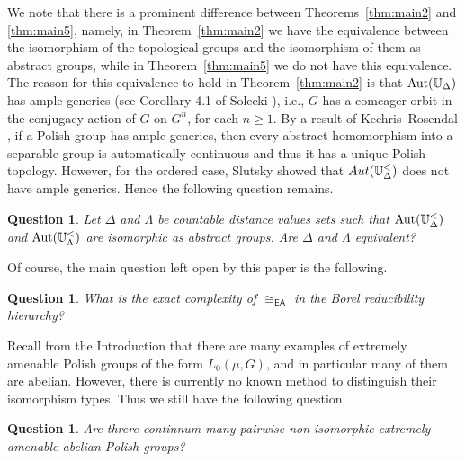 \documentclass{amsart}
\newtheorem{question}[theorem]{Question}
\theoremstyle{definition}
\theoremstyle{remark}
\begin{document}
We note that there is a prominent difference between Theorems~\ref{thm:main2} and \ref{thm:main5}, namely, in Theorem~\ref{thm:main2} we have the equivalence between the isomorphism of the topological groups and the isomorphism of them as abstract groups, while in Theorem~\ref{thm:main5} we do not have this equivalence. The reason for this equivalence to hold in Theorem~\ref{thm:main2} is that $\mbox{\rm Aut}(\mathbb{U}_\Delta)$ has ample generics (see Corollary 4.1 of Solecki \cite{Solecki}), i.e., $G$ has a comeager orbit in the conjugacy action of $G$ on $G^n$, for each $n \geq 1$. By a result of Kechris--Rosendal \cite{KR}, if a Polish group has ample generics, then every abstract homomorphism into a separable group is automatically continuous and thus it has a unique Polish topology. However, for the ordered case, Slutsky \cite{Slutsky} showed that ${\rm Aut}(\mathbb{U}_\Delta^<)$ does not have ample generics. Hence the following question remains.

\begin{question} Let $\Delta$ and $\Lambda$ be countable distance values sets such that $\mbox{\rm Aut}(\mathbb{U}^<_\Delta)$ and $\mbox{\rm Aut}(\mathbb{U}^<_\Lambda)$ are isomorphic as abstract groups. Are $\Delta$ and $\Lambda$ equivalent?
\end{question}

Of course, the main question left open by this paper is the following.

\begin{question} What is the exact complexity of $\cong_{\mathsf{EA}}$ in the Borel reducibility hierarchy?
\end{question} 

Recall from the Introduction that there are many examples of extremely amenable Polish groups of the form $L_0(\mu, G)$, and in particular many of them are abelian. However, there is currently no known method to distinguish their isomorphism types. Thus we still have the following question.

\begin{question} Are threre continnum many pairwise non-isomorphic extremely amenable abelian Polish groups?
\end{question}


\end{document}
